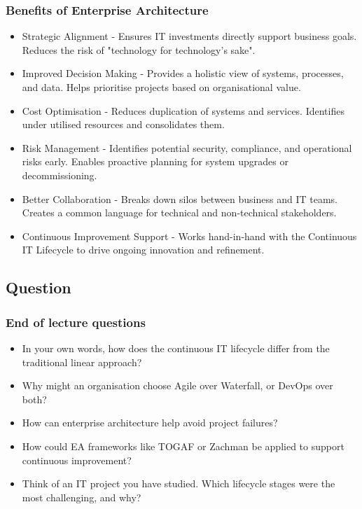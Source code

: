 \subsubsection{Benefits of Enterprise Architecture}

\begin{itemize}
    \item Strategic Alignment - Ensures IT investments directly support business goals. Reduces the risk of "technology for technology’s sake".
    \item Improved Decision Making - Provides a holistic view of systems, processes, and data. Helps prioritise projects based on organisational value.
    \item Cost Optimisation - Reduces duplication of systems and services. Identifies under utilised resources and consolidates them.
    \item Risk Management - Identifies potential security, compliance, and operational risks early. Enables proactive planning for system upgrades or decommissioning.
    \item Better Collaboration - Breaks down silos between business and IT teams. Creates a common language for technical and non-technical stakeholders.
    \item Continuous Improvement Support - Works hand-in-hand with the Continuous IT Lifecycle to drive ongoing innovation and refinement.
\end{itemize}

\subsection{Question}

\subsubsection{End of lecture questions}

\begin{itemize}
    \item In your own words, how does the continuous IT lifecycle differ from the traditional linear approach?
    \item Why might an organisation choose Agile over Waterfall, or DevOps over both?
    \item How can enterprise architecture help avoid project failures?
    \item How could EA frameworks like TOGAF or Zachman be applied to support continuous improvement?
    \item Think of an IT project you have studied. Which lifecycle stages were the most challenging, and why?
\end{itemize}

